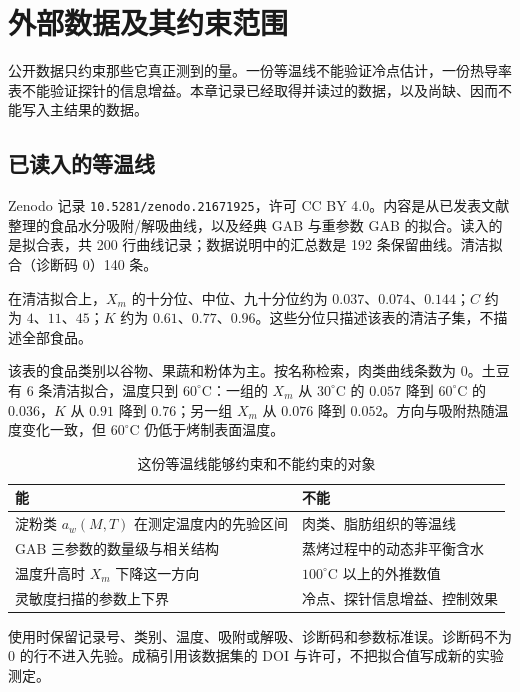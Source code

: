 \chapter{外部数据及其约束范围}
\label{ch:data}

公开数据只约束那些它真正测到的量。一份等温线不能验证冷点估计，一份热导率表不能验证探针的信息增益。本章记录已经取得并读过的数据，以及尚缺、因而不能写入主结果的数据。

\section{已读入的等温线}

Zenodo 记录 \texttt{10.5281/zenodo.21671925}，许可 CC BY 4.0。内容是从已发表文献整理的食品水分吸附/解吸曲线，以及经典 GAB 与重参数 GAB 的拟合。读入的是拟合表，共 200 行曲线记录；数据说明中的汇总数是 192 条保留曲线。清洁拟合（诊断码 0）140 条。

在清洁拟合上，$X_m$ 的十分位、中位、九十分位约为 $0.037$、$0.074$、$0.144$；$C$ 约为 $4$、$11$、$45$；$K$ 约为 $0.61$、$0.77$、$0.96$。这些分位只描述该表的清洁子集，不描述全部食品。

该表的食品类别以谷物、果蔬和粉体为主。按名称检索，肉类曲线条数为 0。土豆有 6 条清洁拟合，温度只到 $60^\circ\mathrm{C}$：一组的 $X_m$ 从 $30^\circ\mathrm{C}$ 的 $0.057$ 降到 $60^\circ\mathrm{C}$ 的 $0.036$，$K$ 从 $0.91$ 降到 $0.76$；另一组 $X_m$ 从 $0.076$ 降到 $0.052$。方向与吸附热随温度变化一致，但 $60^\circ\mathrm{C}$ 仍低于烤制表面温度。

\begin{table}[H]
\centering
\caption{这份等温线能够约束和不能约束的对象}
\begin{tabularx}{\textwidth}{lX}
\toprule
能 & 不能 \\
\midrule
淀粉类 $a_w(M,T)$ 在测定温度内的先验区间 & 肉类、脂肪组织的等温线 \\
GAB 三参数的数量级与相关结构 & 蒸烤过程中的动态非平衡含水 \\
温度升高时 $X_m$ 下降这一方向 & $100^\circ\mathrm{C}$ 以上的外推数值 \\
灵敏度扫描的参数上下界 & 冷点、探针信息增益、控制效果 \\
\bottomrule
\end{tabularx}
\end{table}

使用时保留记录号、类别、温度、吸附或解吸、诊断码和参数标准误。诊断码不为 0 的行不进入先验。成稿引用该数据集的 DOI 与许可，不把拟合值写成新的实验测定。

